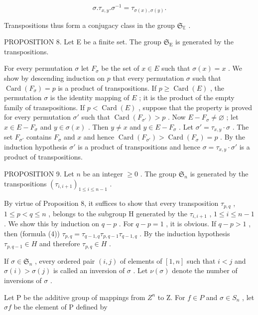 \[
\sigma . \tau_ {x, y}. \sigma^ {- 1} = \tau_ {\sigma (x), \sigma (y)}.\tag{4}
\]

Transpositions thus form a conjugacy class in the group \(\mathfrak{S}_{\mathbb{E}}\) .

PROPOSITION 8. Let E be a finite set. The group \(\mathfrak{S}_{\mathrm{E}}\) is generated by the transpositions.

For every permutation \(\sigma\) let \(F_{\sigma}\) be the set of \(x \in E\) such that \(\sigma(x) = x\) . We show by descending induction on \(p\) that every permutation \(\sigma\) such that \(\operatorname{Card}(F_{\sigma}) = p\) is a product of transpositions. If \(p \geqslant \operatorname{Card}(E)\) , the permutation \(\sigma\) is the identity mapping of \(E\) ; it is the product of the empty family of transpositions. If \(p < \operatorname{Card}(E)\) , suppose that the property is proved for every permutation \(\sigma'\) such that \(\operatorname{Card}(F_{\sigma'}) > p\) . Now \(E - F_{\sigma} \neq \varnothing\) ; let \(x \in E - F_{\sigma}\) and \(y \in \sigma(x)\) . Then \(y \neq x\) and \(y \in E - F_{\sigma}\) . Let \(\sigma' = \tau_{x,y} \cdot \sigma\) . The set \(F_{\sigma'}\) contains \(F_{\sigma}\) and \(x\) and hence \(\operatorname{Card}(F_{\sigma'}) > \operatorname{Card}(F_{\sigma}) = p\) . By the induction hypothesis \(\sigma'\) is a product of transpositions and hence \(\sigma = \tau_{x,y} \cdot \sigma'\) is a product of transpositions.

PROPOSITION 9. Let \(n\) be an integer \(\geqslant 0\) . The group \(\mathfrak{S}_n\) is generated by the transpositions \((\tau_{i,i+1})_{1\leqslant i\leqslant n-1}\) .

By virtue of Proposition 8, it suffices to show that every transposition \(\tau_{p,q}\) , \(1 \leqslant p < q \leqslant n\) , belongs to the subgroup H generated by the \(\tau_{i,i+1}\) , \(1 \leqslant i \leqslant n-1\) . We show this by induction on \(q-p\) . For \(q-p=1\) , it is obvious. If \(q-p>1\) , then (formula (4)) \(\tau_{p,q} = \tau_{q-1,q}\tau_{p,q-1}\tau_{q-1,q}\) . By the induction hypothesis \(\tau_{p,q-1} \in H\) and therefore \(\tau_{p,q} \in H\) .

If \(\sigma \in \mathfrak{S}_n\) , every ordered pair \((i,j)\) of elements of \([1,n]\) such that \(i < j\) and \(\sigma(i) > \sigma(j)\) is called an inversion of \(\sigma\) . Let \(\nu(\sigma)\) denote the number of inversions of \(\sigma\) .

Let P be the additive group of mappings from \(Z^{n}\) to Z. For \(f \in P\) and \(\sigma \in S_{n}\) , let \(\sigma f\) be the element of P defined by

